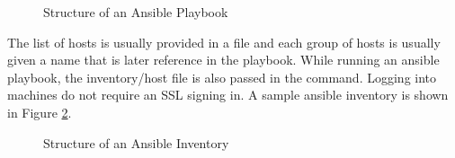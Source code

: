 \documentclass[9pt,twocolumn,twoside]{../../styles/osajnl}
\begin{document}
\begin{figure}[htbp]
\centering
{}
\caption{Structure of an Ansible Playbook \cite{www-ansible}}
\label{fig:playbook}
\end{figure}
The list of hosts is usually provided in a file and each group of hosts is usually given a name that is later reference in the playbook. While running an ansible playbook, the inventory/host file is also passed in the command. Logging into machines do not require an SSL signing in. A sample ansible inventory is shown in Figure \ref{fig:inventory}. 
\begin{figure}[htbp]
\centering
{}
\caption{Structure of an Ansible Inventory \cite{www-ansible}}
\label{fig:inventory}
\end{figure}
\end{document}
